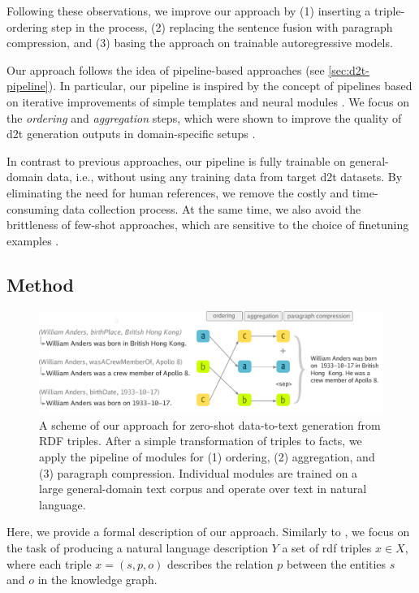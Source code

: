 Following these observations, we improve our approach by (1) inserting a triple-ordering step in the process, (2) replacing the sentence fusion with paragraph compression, and (3) basing the approach on trainable autoregressive models.


Our approach follows the idea of pipeline-based approaches (see \autoref{sec:d2t-pipeline}). In particular, our pipeline is inspired by the concept of pipelines based on iterative improvements of simple templates  \cite{laha2020scalable} and neural modules \cite{ferreiraNeuralDatatotextGeneration2019}. We focus on the \emph{ordering} and \emph{aggregation} steps, which were shown to improve the quality of \ac{d2t} generation outputs in domain-specific setups \cite{moryossef2019improving,moryossef2019step,trisedyaSentenceGenerationEntity2020,su2021plan}.

In contrast to previous approaches, our pipeline is fully trainable on general-domain data, i.e., without using any training data from target \ac{d2t} datasets. By eliminating the need for human references, we remove the costly and time-consuming data collection process. At the same time, we also avoid the brittleness of few-shot approaches, which are sensitive to the choice of finetuning examples \cite{chenFewShotNLGPreTrained2019,suFewShotTabletoTextGeneration2021,changSelectGenChallengeFinding2021}.

\subsection{Method}
\label{sec:pipeline:method}
\begin{figure}[t]
    \centering
    \includegraphics[width=\textwidth]{img/zeroshot_pipeline.pdf}
    \caption[Zero-shot data-to-text generation.]{A scheme of our approach for zero-shot data-to-text generation from RDF triples. After a simple transformation of triples to facts, we apply the pipeline of modules for (1) ordering, (2) aggregation, and (3) paragraph compression. Individual modules are trained on a large general-domain text corpus and operate over text in natural language.}\label{fig:zeroshot:pipeline}
\end{figure}
Here, we provide a formal description of our approach. Similarly to , we focus on the task of producing a natural language description $Y$ a set of \ac{rdf} triples $x \in X$, where each triple $x = (s, p, o)$ describes the relation $p$ between the entities $s$ and $o$ in the knowledge graph.

